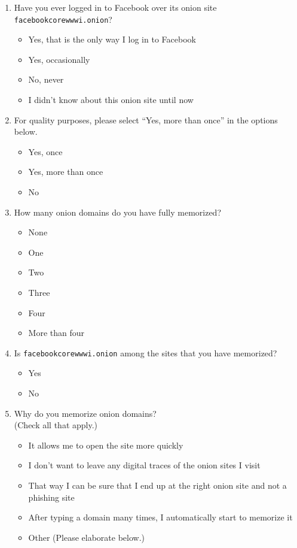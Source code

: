 \begin{enumerate}
    \item Have you ever logged in to Facebook over its onion site
        \texttt{facebookcorewwwi.onion}?
        \begin{itemize}[label=$\Circle$]
            \item Yes, that is the only way I log in to Facebook
            \item Yes, occasionally
            \item No, never
            \item I didn't know about this onion site until now
        \end{itemize}

    \item For quality purposes, please select ``Yes, more than once'' in the
        options below.
        \begin{itemize}[label=$\Circle$]
            \item Yes, once
            \item Yes, more than once
            \item No
        \end{itemize}

    \item How many onion domains do you have fully memorized?
        \begin{itemize}[label=$\Circle$]
            \item None
            \item One
            \item Two
            \item Three
            \item Four
            \item More than four
        \end{itemize}

    \item Is \texttt{facebookcorewwwi.onion} among the sites that you have
        memorized?
        \begin{itemize}[label=$\Circle$]
            \item Yes
            \item No
        \end{itemize}

    \item Why do you memorize onion domains?\\(Check all that apply.)
        \begin{itemize}[label=$\Square$]
            \item It allows me to open the site more quickly
            \item I don't want to leave any digital traces of the onion sites I
                visit
            \item That way I can be sure that I end up at the right onion site
                and not a phishing site
            \item After typing a domain many times, I automatically start to
                memorize it
            \item Other (Please elaborate below.)
        \end{itemize}


\end{enumerate}
